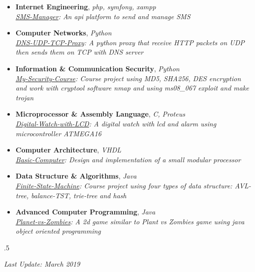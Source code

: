 \documentclass[margin]{res}
\begin{document}
\begin{resume}
\begin{itemize} \itemsep +3pt

\item \textbf{Internet Engineering}, {\sl php, symfony, xampp}\\
\textit{\href{https://github.com/aliyazdi75/sms-manager}{SMS-Manager}: An api platform to send and manage SMS}

\item \textbf{Computer Networks}, {\sl Python}\\
\textit{\href{https://github.com/aliyazdi75/DNS-UDP-TCP-Proxy}{DNS-UDP-TCP-Proxy}: A python proxy that receive HTTP packets on UDP then sends them on TCP with DNS server}

\item \textbf{Information \& Communication Security}, {\sl Python}\\
\textit{\href{https://github.com/aliyazdi75/My-Security-Course}{My-Security-Course}: Course project using MD5, SHA256, DES encryption and work with cryptool software nmap and using ms08\_067 exploit and make trojan}

\item \textbf{Microprocessor \& Assembly Language}, {\sl C, Proteus}\\
\textit{\href{https://github.com/aliyazdi75/Digital-Watch-with-LCD}{Digital-Watch-with-LCD}: A digital watch with lcd and alarm using microcontroller ATMEGA16}


\item \textbf{Computer Architecture}, {\sl VHDL}\\
\textit{\href{https://github.com/aliyazdi75/Basic-Computer-SAYEH-vhdl}{Basic-Computer}: Design and implementation of a small modular processor}

\item \textbf{Data Structure \& Algorithms}, {\sl Java}\\
\textit{\href{https://github.com/aliyazdi75/Finite-State-Machine}{Finite-State-Machine}: Course project using four types of data structure: AVL-tree, balance-TST, trie-tree and hash}

\item \textbf{Advanced Computer Programming}, {\sl Java}\\
\textit{\href{https://github.com/aliyazdi75/Planet\_vs\_Zombies}{Planet-vs-Zombies}: A 2d game similar to Plant vs Zombies game using java object oriented programming}

\end{itemize}

\moveleft.5\hoffset\centerline{\textit{Last Update: March 2019}}

\end{resume}
\end{document}
